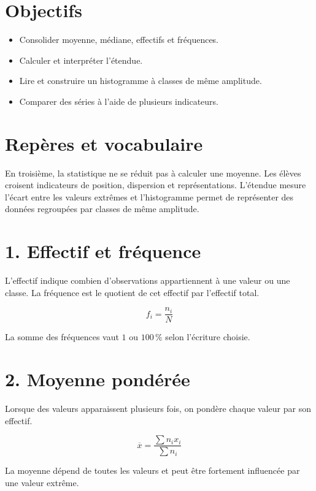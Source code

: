 
\section{Objectifs}
\begin{itemize}
\item Consolider moyenne, médiane, effectifs et fréquences.
\item Calculer et interpréter l’étendue.
\item Lire et construire un histogramme à classes de même amplitude.
\item Comparer des séries à l’aide de plusieurs indicateurs.
\end{itemize}

\section{Repères et vocabulaire}
En troisième, la statistique ne se réduit pas à calculer une moyenne. Les élèves croisent indicateurs de position, dispersion et représentations. L’étendue mesure l’écart entre les valeurs extrêmes et l’histogramme permet de représenter des données regroupées par classes de même amplitude.

\section{1. Effectif et fréquence}
L’effectif indique combien d’observations appartiennent à une valeur ou une classe. La fréquence est le quotient de cet effectif par l’effectif total.

\[
f_i=\dfrac{n_i}{N}
\]

\begin{exemple}
La somme des fréquences vaut $1$ ou $100\,\%$ selon l’écriture choisie.
\end{exemple}

\section{2. Moyenne pondérée}
Lorsque des valeurs apparaissent plusieurs fois, on pondère chaque valeur par son effectif.

\[
\overline x=\dfrac{\sum n_ix_i}{\sum n_i}
\]

\begin{exemple}
La moyenne dépend de toutes les valeurs et peut être fortement influencée par une valeur extrême.
\end{exemple}

